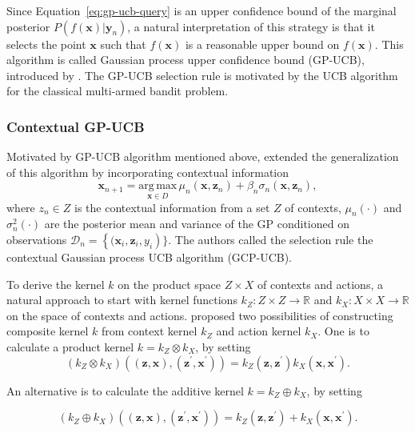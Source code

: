 \documentclass{article}
\begin{document}
Since Equation~\ref{eq:gp-ucb-query} is an upper confidence bound of
the marginal posterior $P(f(\mathbf{x})|\mathbf{y}_n)$, a natural
interpretation of this strategy is that it selects the point
$\mathbf{x}$ such that $f(\mathbf{x})$ is a reasonable upper bound on
$f(\mathbf{x})$. This algorithm is called Gaussian process upper
confidence bound (GP-UCB), introduced by \cite{Srinivas2010-hi}. The
GP-UCB selection rule is motivated by the UCB algorithm for the
classical multi-armed bandit problem.

\subsubsection{Contextual GP-UCB}
Motivated by GP-UCB algorithm mentioned above, \cite{Krause2011-sb}
extended the generalization of this algorithm by incorporating
contextual information
\begin{equation}
  \mathbf{x}_{n+1} = \underset{\mathbf{x} \in D}{\mathrm{arg \,
      max}}\,\mu_n(\mathbf{x}, \mathbf{z}_n)+\beta_n
  \sigma_n(\mathbf{x}, \mathbf{z}_n),
\end{equation} \label{eq:cgp-ucb-query}
where $z_n \in Z$ is the contextual information from a set $Z$ of
contexts, $\mu_n(\cdot)$ and $\sigma_n^2(\cdot)$ are the posterior mean
and variance of the GP conditioned on observations $\mathcal{D}_n =
\left \{( \mathbf{x}_i, \mathbf{z}_i, y_i \right )\}.$ The authors
called the selection rule the contextual Gaussian process UCB
algorithm (GCP-UCB).

To derive the kernel $k$ on the product space $Z\times X$ of contexts and
actions, a natural approach to start with kernel functions $k_Z:
Z\times Z \rightarrow \mathbb{R}$ and $k_X:X \times X \rightarrow
\mathbb{R}$ on the space of contexts and actions. \cite{Krause2011-sb}
proposed two possibilities of constructing composite kernel $k$ from
context kernel $k_Z$ and action kernel $k_X$. One is to calculate a
product kernel $k=k_Z\otimes k_X$, by setting
\begin{equation}
  (k_Z\otimes k_X)((\mathbf{z}, \mathbf{x}),(\mathbf{z}^{\prime},
  \mathbf{x}^{\prime})) = k_Z(\mathbf{z}, \mathbf{z}^{\prime})k_X(\mathbf{x}, \mathbf{x}^{\prime}).
\end{equation}

An alternative is to calculate the additive kernel $k=k_Z\oplus k_X$,
by setting

\begin{equation}
  (k_Z\oplus k_X)((\mathbf{z}, \mathbf{x}),(\mathbf{z}^{\prime},
  \mathbf{x}^{\prime})) = k_Z(\mathbf{z}, \mathbf{z}^{\prime})+k_X(\mathbf{x}, \mathbf{x}^{\prime}).
\end{equation}
\end{document}
